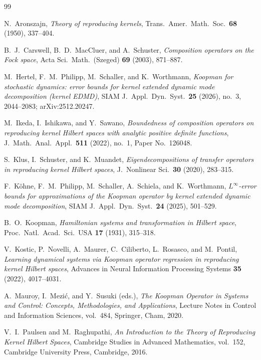 \documentclass[11pt]{amsart}
\numberwithin{equation}{section}
\theoremstyle{definition}
\theoremstyle{remark}
\begin{document}
\begin{thebibliography}{99}

N.~Aronszajn, \emph{Theory of reproducing kernels}, Trans.\ Amer.\ Math.\ Soc.\ \textbf{68} (1950), 337--404.

B.~J.~Carswell, B.~D.~MacCluer, and A.~Schuster, \emph{Composition operators on the Fock space}, Acta Sci.\ Math.\
(Szeged) \textbf{69} (2003), 871--887.

M.~Hertel, F.~M.~Philipp, M.~Schaller, and K.~Worthmann, \emph{Koopman for stochastic dynamics: error bounds for kernel
extended dynamic mode decomposition (kernel EDMD)}, SIAM J.\ Appl.\ Dyn.\ Syst.\ \textbf{25} (2026), no.~3, 2044--2083;
arXiv:2512.20247.

M.~Ikeda, I.~Ishikawa, and Y.~Sawano, \emph{Boundedness of composition operators on reproducing kernel Hilbert spaces
with analytic positive definite functions}, J.\ Math.\ Anal.\ Appl.\ \textbf{511} (2022), no.~1, Paper No.~126048.

S.~Klus, I.~Schuster, and K.~Muandet, \emph{Eigendecompositions of transfer operators in reproducing kernel Hilbert
spaces}, J.\ Nonlinear Sci.\ \textbf{30} (2020), 283--315.

F.~K\"ohne, F.~M.~Philipp, M.~Schaller, A.~Schiela, and K.~Worthmann, \emph{$L^\infty$-error bounds for approximations
of the Koopman operator by kernel extended dynamic mode decomposition}, SIAM J.\ Appl.\ Dyn.\ Syst.\ \textbf{24} (2025),
501--529.

B.~O.~Koopman, \emph{Hamiltonian systems and transformation in Hilbert space}, Proc.\ Natl.\ Acad.\ Sci.\ USA
\textbf{17} (1931), 315--318.

V.~Kostic, P.~Novelli, A.~Maurer, C.~Ciliberto, L.~Rosasco, and M.~Pontil, \emph{Learning dynamical systems via Koopman
operator regression in reproducing kernel Hilbert spaces}, Advances in Neural Information Processing Systems
\textbf{35} (2022), 4017--4031.

A.~Mauroy, I.~Mezi\'c, and Y.~Susuki (eds.), \emph{The Koopman Operator in Systems and Control: Concepts,
Methodologies, and Applications}, Lecture Notes in Control and Information Sciences, vol.~484, Springer, Cham, 2020.

V.~I.~Paulsen and M.~Raghupathi, \emph{An Introduction to the Theory of Reproducing Kernel Hilbert Spaces}, Cambridge
Studies in Advanced Mathematics, vol.~152, Cambridge University Press, Cambridge, 2016.


\end{thebibliography}
\end{document}

